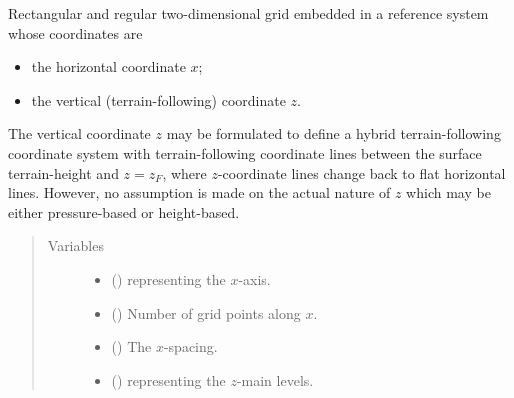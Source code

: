 \documentclass[letterpaper,10pt,english]{sphinxmanual}
\begin{document}
\begin{fulllineitems}
\label{\detokenize{api:grids.grid_xz.GridXZ}}
Rectangular and regular two-dimensional grid embedded in a reference system whose coordinates are
\begin{itemize}
\item {} 
the horizontal coordinate \(x\);

\item {} 
the vertical (terrain-following) coordinate \(z\).

\end{itemize}

The vertical coordinate \(z\) may be formulated to define a hybrid terrain-following coordinate system
with terrain-following coordinate lines between the surface terrain-height and \(z = z_F\), where
\(z\)-coordinate lines change back to flat horizontal lines. However, no assumption is made on the actual
nature of \(z\) which may be either pressure-based or height-based.
\begin{quote}\begin{description}
\item[{Variables}] \leavevmode\begin{itemize}
\item {} 
{\hyperref[\detokenize{api:grids.grid_xyz.GridXYZ.x}]{}} () \textendash{} {\hyperref[\detokenize{api:grids.axis.Axis}]{}} representing the \(x\)-axis.

\item {} 
{\hyperref[\detokenize{api:grids.grid_xyz.GridXYZ.nx}]{}} () \textendash{} Number of grid points along \(x\).

\item {} 
{\hyperref[\detokenize{api:grids.grid_xyz.GridXYZ.dx}]{}} () \textendash{} The \(x\)-spacing.

\item {} 
 () \textendash{} {\hyperref[\detokenize{api:grids.axis.Axis}]{}} representing the \(z\)-main levels.


\end{itemize}
\end{description}
\end{quote}
\end{fulllineitems}
\end{document}
